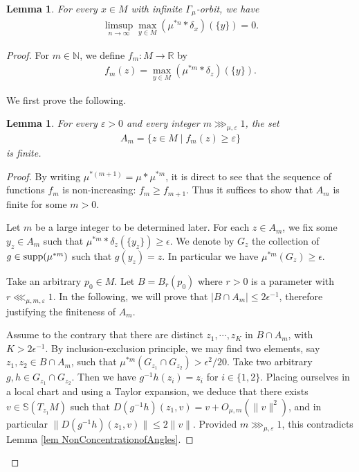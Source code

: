 \documentclass[11pt, leqno, fleqn]{amsart}
\def\eps{\varepsilon}
\newcommand{\margem}[1]{\marginpar{{\scriptsize {#1}}}}
\def\clo{   \color{orange}}
\def \R{{\mathbb R}}
\def \N{{\mathbb N}}
\newcommand{\cK}{{\mathcal K}}
\newcommand{\aryst}{\begin{eqnarray*}}
\newcommand{\earyst}{\end{eqnarray*}}
\newtheorem{lemma}[thm]{\bf Lemma}
\theoremstyle{definition}
\theoremstyle{definition}
\def\supp{{\rm supp}}
\def\S{ {\mathbb{S}} }
\begin{document}
\begin{lemma} \label{lem massdecay2}
	For every $x \in M$ with infinite $\Gamma_{\mu}$-orbit, we have 
	\aryst
	\limsup_{n \to \infty} \max_{y \in M}( \mu^{* n} * \delta_{x} )(\{ y \}) = 0.
	\earyst
\end{lemma}








\begin{proof} 
	 
	
	For $m \in \N$,   we define $f_m : M \to \R$ by
		\aryst
		f_m(z) = \max_{y \in M} (\mu^{*m} * \delta_z)(\{ y \}).
			\earyst

		
	We first prove the following. 
	\begin{lemma} \label{lem AmFinite}
		For every $\eps > 0$ and every integer $m \ggg_{\mu, \eps} 1$, the set
		\aryst
		A_m = \{ z \in M \mid f_m(z) \geq \eps \}
		\earyst
		is finite.
	\end{lemma}
	
	\begin{proof}
		
		By writing $\mu^{*(m+1)}=\mu*\mu^{*m}$, it is direct to see that the sequence of functions $f_{m}$ is non-increasing: $f_{m}\geq f_{m+1}$. Thus it suffices to show that $A_m$ is finite for some $m  > 0$.
		
		Let $m$ be a large integer to be determined later. 	For each $z \in A_m$, we fix some $y_z \in A_m$ such that   $\mu^{*m} * \delta_z(\{ y_z \})  \geq \epsilon$.  We denote by $G_{z}$ the collection of $g \in \supp(\mu^{* m})$ such that $g(y_z) = z$. In particular we have $\mu^{*m}(G_{z}) \geq \epsilon$.
		
		Take an arbitrary $p_0 \in M$. Let $B = B_r(p_0)$ where $r > 0$ is a parameter with $r \lll_{\mu, m, \eps} 1$. In the following, we will prove that  $| B \cap A_m| \leq 2\epsilon^{-1}$, therefore justifying the finiteness of  $A_{m}$.
				
		Assume to the contrary that there are  distinct $z_1, \cdots, z_{K}$ in $B \cap A_m$, with $K >  2 \epsilon^{-1}$. By inclusion-exclusion principle, we may find two elements, say $z_1, z_2 \in B \cap A_m$, such that $\mu^{*m}(G_{z_1} \cap G_{z_2}) > \epsilon^{2}/20$.
		Take two arbitrary $g, h \in G_{z_1} \cap G_{z_2}$. Then we have $g^{-1}h (z_i) = z_i$  for $i \in \{1,2\}$. Placing ourselves in a local chart and using a Taylor expansion, we  deduce that there exists $v \in \S(T_{z_1}M)$ such that $D(g^{-1}h)(z_1, v) = v + O_{\mu, m}(\|v\|^2)$, and in particular $\|D(g^{-1}h)(z_1, v)\|\leq 2\|v\|$. Provided $m \ggg_{\mu, \eps} 1$, this  contradicts Lemma \ref{lem NonConcentrationofAngles}.
	\end{proof}
	

\end{proof}
\end{document}
